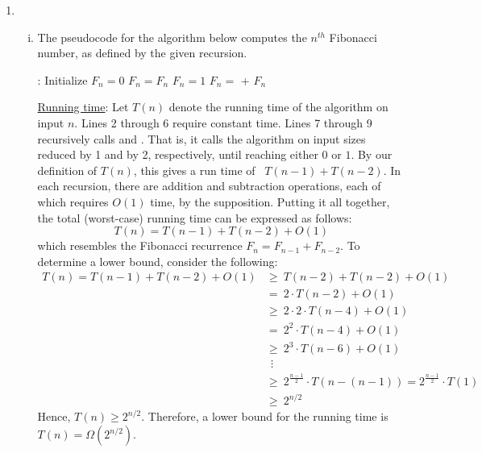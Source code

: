 \documentclass[twoside,11pt]{homework}
\newcommand\NoProc{\renewcommand\algorithmicprocedure{}}
\begin{document}
\begin{enumerate}[\bf (a)]
\item 
\begin{enumerate}[i.)]

\item  The pseudocode for the algorithm below computes the $n^{th}$ Fibonacci number, as defined by the given recursion. 
\begin{algorithm}[H]
\begin{algorithmic}[1]
\NoProc
{}: 
\State Initialize $F_n = 0$ 
\State $F_n = F_n$
\State $F_n = 1$
\Else
\State $F_n  = $  + 
\EndIf
\State \Return $F_n$
\EndProcedure 
\end{algorithmic}
\end{algorithm}
\noindent
\underline{Running time}: Let $T(n)$ denote the running time of the algorithm on input $n$.  Lines 2 through 6 require constant time.  Lines 7 through 9 recursively calls  and . That is, it calls the algorithm on input sizes reduced by 1 and by 2, respectively,  until reaching either $0$ or $1$. By our definition of $T(n)$,  this gives a run time of \ $T(n-1) + T(n-2)$.  In each recursion, there are addition and subtraction operations, each of which requires $O(1)$ time, by the supposition. Putting it all together,  the total (worst-case) running time can be expressed as follows:
$$T(n) = T(n-1) + T(n-2) + O(1)$$
which resembles the Fibonacci recurrence $F_n = F_{n-1} + F_{n-2}$.  To determine a lower bound, consider the following:
\begin{align*}
T(n) = T(n-1) + T(n-2) + O(1) & \geq \ T(n-2) + T(n-2) + O(1) \\
& = \ 2 \cdot T(n-2) + O(1) \\
& \geq \ 2 \cdot 2 \cdot T(n-4) + O(1)  \\
& = \ 2^2 \cdot T(n-4) + O(1)  \\
& \geq \ 2^3 \cdot T(n-6) + O(1) \\
& \ \ \vdots \\
& \geq \ 2^{\frac{n-1}{2}} \cdot T(n-(n-1)) = 2^{\frac{n-1}{2}} \cdot T(1) \\
& \geq \ 2^{n/2} 
\end{align*} 
Hence,  $ T(n) \geq 2^{n/2}. $ Therefore, a lower bound for the running time is  $ T(n) = \Omega(2^{n/2})$.


\end{enumerate}
\end{enumerate}
\end{document}
